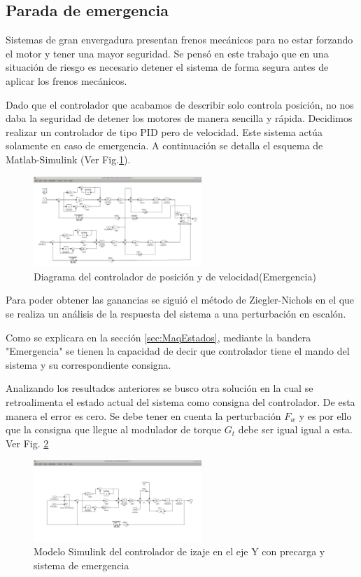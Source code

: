 \documentclass[journal]{IEEEtran}
\begin{document}
\subsection{Parada de emergencia}
Sistemas de gran envergadura presentan frenos mecánicos para no estar forzando el motor
y tener una mayor seguridad. Se pensó en este trabajo que en una situación de riesgo
es necesario detener el sistema de forma segura antes de aplicar los frenos mecánicos.

Dado que el controlador que acabamos de describir solo controla posición, 
no nos daba la seguridad de detener los motores de manera sencilla y rápida. 
Decidimos realizar un controlador de tipo PID 
pero de velocidad. Este sistema actúa solamente en caso de emergencia. A continuación se 
detalla el esquema de Matlab-Simulink (Ver Fig.\ref{fig:ControlVel}).

\begin{figure}[!t]
 \centering
  \includegraphics[width=2.5in]{Test_Controlador_emergencia1.jpeg}
  \caption{Diagrama del controlador de posición y de velocidad(Emergencia)}
  \label{fig:ControlVel}
\end{figure}

Para poder obtener las ganancias se siguió el método de Ziegler-Nichols en el que se 
realiza un análisis de la respuesta del sistema a una perturbación en escalón.

Como se explicara en la sección \ref{sec:MaqEstados}, mediante la bandera "Emergencia" 
se tienen la capacidad de decir que controlador tiene el mando del sistema y su 
correspondiente consigna.

Analizando los resultados anteriores se busco otra solución en la cual se retroalimenta 
el estado actual del sistema como consigna del controlador. De esta manera el error es 
cero. Se debe tener en cuenta la perturbación $F_w$ y es por ello que la consigna que 
llegue al modulador de torque $G_t$ debe ser igual igual a esta. Ver Fig.
\ref{fig:testVel} 

\begin{figure}[!t]
 \centering
  \includegraphics[width=2.5in]{Controlador_precarga_velocidad.jpeg}
  \caption{Modelo Simulink del controlador de izaje en el eje Y con precarga y sistema de 
  emergencia}
  \label{fig:testVel}
\end{figure}
\end{document}
